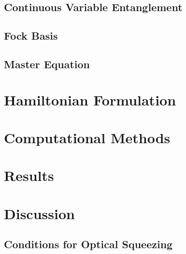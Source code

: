 \documentclass[aps,pra,twocolumn,showpacs,amsmath,amssymb,nofootinbib,longbibliography,superscriptaddress
]{revtex4-1}
\theoremstyle{definition}
\theoremstyle{remark}
\newcommand{\0}{\hat{0}}
\begin{document}
\subsection{Continuous Variable Entanglement}

\subsection{Fock Basis}

\subsection{Master Equation}




\section{Hamiltonian Formulation}


\section{Computational Methods}


\section{Results}


\section{Discussion}

\subsection{Conditions for Optical Squeezing}



\end{document}
